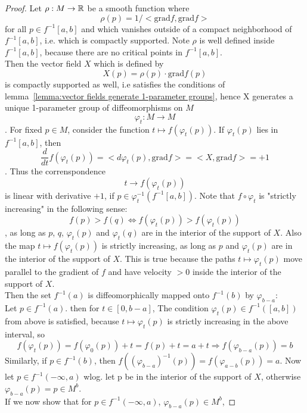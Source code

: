 \begin{proof}
   Let $\rho: M \rightarrow {\mathbb R}$ be a smooth function where 
   \[ \rho(p) = 1/<\text{grad} f, \text{grad} f> \]
   for all $p \in f^{-1}[a, b]$ and which vanishes outside of a compact 
   neighborhood of $f^{-1}[a, b]$, i.e. which is compactly supported.
   Note $\rho$ is well defined inside $f^{-1}[a, b]$, because there are no 
   critical points in $f^{-1}[a, b]$. \\ 
   Then the vector field $X$ which is defined by
   \[ X(p) = \rho(p) \cdot \text{grad} f (p) \]
   is compactly supported as well, i.e satisfies the conditions of 
   lemma~\ref{lemma:vector fields generate 1-parameter groups}, hence X generates 
   a unique 1-parameter group of diffeomorphisms on $M$
   \[ \varphi_t : M \rightarrow M \]. 
   For fixed $p \in M$, consider the function 
   $ t \mapsto f(\varphi_t(p)) $. If $\varphi_t(p)$ lies in $f^{-1}[a, b]$, then
   \[ \frac{d}{dt}f (\varphi_t(p)) = <d\varphi_t(p), \text{grad}f> = <X, \text{grad}f> = + 1 \].
   Thus the correnspondence 
   \[ t \rightarrow f(\varphi_t(p)) \]
   is linear with derivative $+1$, if $p \in \varphi_t^{-1}(f^{-1}[a, b])$. 
   Note that $f \circ \varphi_t$ is "strictly increasing" in the following sense:
   \[ f(p) > f(q) \Leftrightarrow f(\varphi_t(p)) > f(\varphi_t(p)) \]
   , as long as $p$, $q$, $\varphi_t(p)$ and $\varphi_t(q)$ are in the interior
   of the support of $X$. Also the map $t \mapsto f(\varphi_t(p))$ is strictly
   increasing, as long as $p$ and $\varphi_t(p)$ are in the interior of the
   support of $X$. This is true because the paths $t \mapsto \varphi_t(p)$ move
   parallel to the gradient of $f$ and have velocity $>0$ inside the interior 
   of the support of $X$. \\
   Then the set $f^{-1}(a)$ is diffeomorphically mapped onto $f^{-1}(b)$ by $\varphi_{b-a}$: \\
   Let $p \in f^{-1}(a)$. then for $t \in [0, b-a]$, The condition 
   $\varphi_t(p) \in f^{-1}([a, b])$ from above is satisfied, because
   $t \mapsto \varphi_t(p)$ is strictly increasing in the above interval, so 
   \[ f(\varphi_t(p)) = f(\varphi_0(p)) + t = f(p) + t 
   = a + t \Rightarrow f(\varphi_{b-a}(p)) = b \]
   Similarly, if $p \in f^{-1}(b)$, then 
   $f((\varphi_{b-a})^{-1}(p)) = f(\varphi_{a-b}(p)) = a$. 
   Now let $p \in f^{-1}(-\infty, a)$ wlog. let p be in the interior of the 
   support of $X$, otherwise $\varphi_{b-a}(p) = p \in M^b$. \\
   If we now show that for $p \in f^{-1}(-\infty, a)$, $\varphi_{b-a}(p) \in M^b$,

\end{proof}
